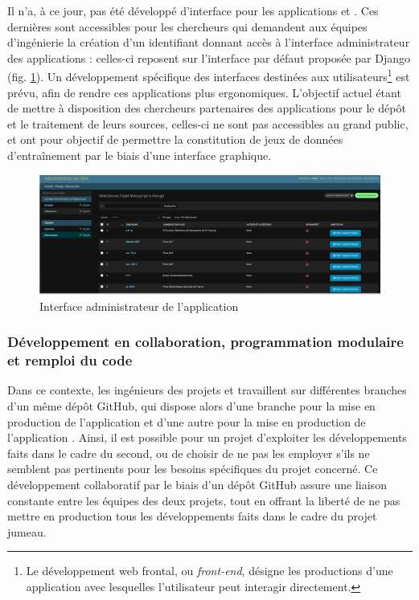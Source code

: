     Il n'a, à ce jour, pas été développé d'interface pour les applications \eida et \vhs. Ces dernières sont accessibles pour les chercheurs qui demandent aux équipes d'ingénierie la création d'un identifiant donnant accès à l'interface administrateur des applications : celles-ci reposent sur l'interface par défaut proposée par Django (fig. \ref{fig:eida_admin}). Un développement spécifique des interfaces destinées aux utilisateurs\footnote{Le développement web frontal, ou \textit{front-end}, désigne les productions d'une application avec lesquelles l'utilisateur peut interagir directement.} est prévu, afin de rendre ces applications plus ergonomiques. L'objectif actuel étant de mettre à disposition des chercheurs partenaires des applications pour le dépôt et le traitement de leurs sources, celles-ci ne sont pas accessibles au grand public, et ont pour objectif de permettre la constitution de jeux de données d'entraînement par le biais d'une interface graphique. 
    
    \begin{figure}[h]
    	\centering
    	\includegraphics[width=16cm]{images/eida_admin.png}
    	\caption{Interface administrateur de l'application \eida}
    	\label{fig:eida_admin}
    \end{figure}
    
    \subsubsection{Développement en collaboration, programmation modulaire et remploi du code}
    Dans ce contexte, les ingénieurs des projets \eida et \vhs travaillent sur différentes branches d'un même dépôt GitHub, qui dispose alors d'une branche pour la mise en production de l'application \eida et d'une autre pour la mise en production de l'application \vhs. Ainsi, il est possible pour un projet d'exploiter les développements faits dans le cadre du second, ou de choisir de ne pas les employer s'ils ne semblent pas pertinents pour les besoins spécifiques du projet concerné. Ce développement collaboratif par le biais d'un dépôt GitHub assure une liaison constante entre les équipes des deux projets, tout en offrant la liberté de ne pas mettre en production tous les développements faits dans le cadre du projet jumeau.
    
